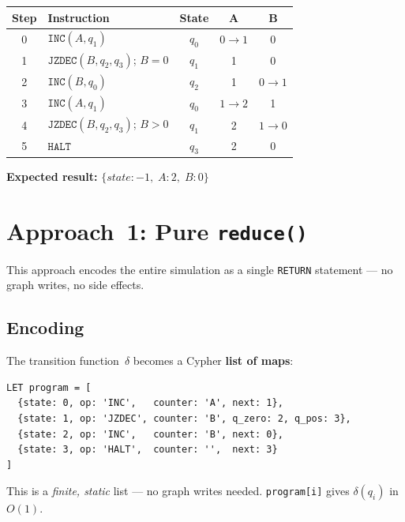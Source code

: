 \documentclass[11pt,a4paper]{article}
\begin{document}
\begin{center}
\small
\begin{tabular}{@{}clccc@{}}
\toprule
\textbf{Step} & \textbf{Instruction} & \textbf{State} & \textbf{A} & \textbf{B} \\
\midrule
0 & $\texttt{INC}(A, q_1)$            & $q_0$ & $0 \to 1$ & 0 \\
1 & $\texttt{JZDEC}(B, q_2, q_3)$; $B{=}0$ & $q_1$ & 1 & 0 \\
2 & $\texttt{INC}(B, q_0)$            & $q_2$ & 1 & $0 \to 1$ \\
3 & $\texttt{INC}(A, q_1)$            & $q_0$ & $1 \to 2$ & 1 \\
4 & $\texttt{JZDEC}(B, q_2, q_3)$; $B{>}0$ & $q_1$ & 2 & $1 \to 0$ \\
5 & $\texttt{HALT}$                    & $q_3$ & 2 & 0 \\
\bottomrule
\end{tabular}
\end{center}

\textbf{Expected result:} $\{state: -1,\; A: 2,\; B: 0\}$


\section{Approach~1: Pure \texttt{reduce()}}

This approach encodes the entire simulation as a single \texttt{RETURN}
statement --- no graph writes, no side effects.

\subsection{Encoding}

The transition function~$\delta$ becomes a Cypher \textbf{list of maps}:

\begin{codeblock}
\begin{lstlisting}
LET program = [
  {state: 0, op: 'INC',   counter: 'A', next: 1},
  {state: 1, op: 'JZDEC', counter: 'B', q_zero: 2, q_pos: 3},
  {state: 2, op: 'INC',   counter: 'B', next: 0},
  {state: 3, op: 'HALT',  counter: '',  next: 3}
]
\end{lstlisting}
\end{codeblock}

This is a \emph{finite, static} list --- no graph writes needed.
\texttt{program[i]} gives $\delta(q_i)$ in $O(1)$.
\end{document}
